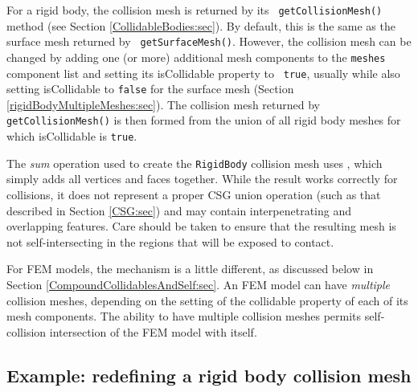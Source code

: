 For a rigid body, the collision mesh is returned by its {\tt
getCollisionMesh()} method (see Section \ref{CollidableBodies:sec}).
By default, this is the same as the surface mesh returned by {\tt
getSurfaceMesh()}. However, the collision mesh can be changed by
adding one (or more) additional mesh components to the {\tt meshes}
component list and setting its {\sf isCollidable} property to {\tt
true}, usually while also setting {\sf isCollidable} to {\tt false}
for the surface mesh (Section \ref{rigidBodyMultipleMeshes:sec}). The
collision mesh returned by {\tt getCollisionMesh()} is then formed
from the union of all rigid body meshes for which {\sf isCollidable}
is {\tt true}.

\begin{sideblock}
The {\it sum} operation used to create the {\tt RigidBody} collision
mesh uses , which simply
adds all vertices and faces together. While the result works correctly
for collisions, it does not represent a proper CSG union operation
(such as that described in Section \ref{CSG:sec}) and may contain
interpenetrating and overlapping features. Care should be taken to
ensure that the resulting mesh is not self-intersecting in the regions
that will be exposed to contact.
\end{sideblock}

For FEM models, the mechanism is a little different, as discussed
below in Section \ref{CompoundCollidablesAndSelf:sec}.  An FEM model
can have {\it multiple} collision meshes, depending on the setting of
the {\sf collidable} property of each of its mesh components.  The
ability to have multiple collision meshes permits self-collision
intersection of the FEM model with itself.

\subsection{Example: redefining a rigid body collision mesh}

